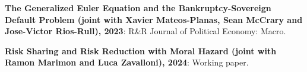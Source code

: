 \documentclass[letterpaper,11pt]{article}
\newcommand{\resumeItem}[2]{
  \item\small{
    \textbf{#1}{: #2 \vspace{-2pt}}
  }
}
\newcommand{\resumeSubItem}[2]{\resumeItem{#1}{#2}\vspace{-1pt}}
\begin{document}
\resumeSubItem{The Generalized Euler Equation and the Bankruptcy-Sovereign Default Problem (joint with Xavier Mateos-Planas, Sean McCrary and Jose-Victor Rios-Rull), 2023}{ R\&R Journal of Political Economy: Macro.}%
\resumeSubItem{Risk Sharing and Risk Reduction with Moral Hazard (joint with Ramon Marimon and Luca Zavalloni), 2024}{Working paper.} %
\end{document}
